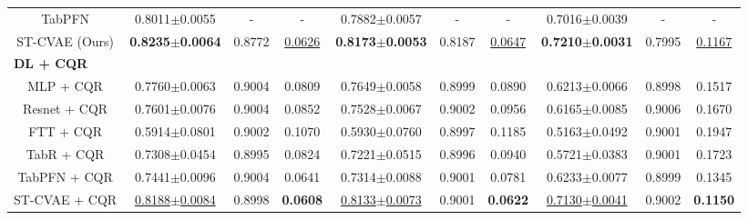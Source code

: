 \documentclass[journal]{IEEEtran}
\begin{document}
\begin{table}[ht]
\begin{tabular}{cccccccccc}
        TabPFN         & 0.8011$\pm$0.0055 & -      & -      & 0.7882$\pm$0.0057 & -      & -      & 0.7016$\pm$0.0039 & -      & -      \\
        ST-CVAE (Ours) & \textbf{0.8235$\pm$0.0064} & 0.8772 & \underline{0.0626} & \textbf{0.8173$\pm$0.0053} & 0.8187 & \underline{0.0647} & \textbf{0.7210$\pm$0.0031} & 0.7995 & \underline{0.1167} \\
        \multicolumn{1}{l}{\textbf{DL + CQR}}&&&&&&&&&\\
        MLP + CQR      & 0.7760$\pm$0.0063 & 0.9004 & 0.0809 & 0.7649$\pm$0.0058 & 0.8999 & 0.0890 & 0.6213$\pm$0.0066 & 0.8998 & 0.1517 \\
        Resnet + CQR   & 0.7601$\pm$0.0076 & 0.9004 & 0.0852 & 0.7528$\pm$0.0067 & 0.9002 & 0.0956 & 0.6165$\pm$0.0085 & 0.9006 & 0.1670 \\
        FTT + CQR      & 0.5914$\pm$0.0801 & 0.9002 & 0.1070 & 0.5930$\pm$0.0760 & 0.8997 & 0.1185 & 0.5163$\pm$0.0492 & 0.9001 & 0.1947 \\
        TabR + CQR     & 0.7308$\pm$0.0454 & 0.8995 & 0.0824 & 0.7221$\pm$0.0515 & 0.8996 & 0.0940 & 0.5721$\pm$0.0383 & 0.9001 & 0.1723 \\
        TabPFN + CQR   & 0.7441$\pm$0.0096 & 0.9004 & 0.0641 & 0.7314$\pm$0.0088 & 0.9001 & 0.0781 & 0.6233$\pm$0.0077 & 0.8999 & 0.1345 \\
        ST-CVAE + CQR  & \underline{0.8188$\pm$0.0084} & 0.8998 & \textbf{0.0608} & \underline{0.8133$\pm$0.0073} & 0.9001 & \textbf{0.0622} & \underline{0.7130$\pm$0.0041} & 0.9002 & \textbf{0.1150} \\
        \bottomrule
    \end{tabular}
\end{table}
\end{document}

